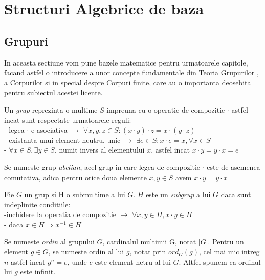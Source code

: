 %
%
\let\textcircled=\pgftextcircled

\chapter{Structuri Algebrice de baza} 
\section{Grupuri}
\label{sec:sec01}
In aceasta sectiune vom pune bazele matematice pentru urmatoarele capitole, facand astfel o introducere a unor concepte fundamentale din Teoria Grupurilor , a Corpurilor si in special despre Corpuri finite, care au o importanta deosebita pentru subiectul acestei licente.
\begin{dfn}
Un \textit{grup} reprezinta o multime $S$ impreuna cu o operatie de compozitie $\cdot$ astfel incat sunt respectate urmatoarele reguli:
\\ - legea $\cdot$ e asociativa $\rightarrow$ $\forall x, y, z\in S: (x\cdot y)\cdot z = x\cdot (y \cdot z)$
\\ - existanta unui element neutru, unic $\rightarrow$ $\exists e\in S: x \cdot e = x, \forall x\in S$
\\ - $\forall x\in S, \exists y\in S$, numit invers al elementului $x$, astfel incat $x\cdot y = y\cdot x = e$
\end{dfn}

\begin{dfn}
Se numeste grup \textit{abelian}, acel grup in care legea de compozitie $\cdot$ este de asemenea comutativa, adica pentru orice doua elemente
$x, y \in S$ avem $x \cdot y = y \cdot x$
\end{dfn}

\begin{dfn}
Fie $G$ un grup si H o submultime a lui $G$. $H$ este un \textit{subgrup} a lui $G$ daca sunt indeplinite conditiile:
\\ -inchidere la operatia de compozitie $\rightarrow$ $\forall x, y \in H, x \cdot y \in H$
\\ - daca $x \in H \Rightarrow x^{-1} \in H$
\end{dfn}

\begin{dfn}
Se numeste \textit{ordin} al grupului $G$, cardinalul multimii G, notat $|G|$. Pentru un element $g \in G$, se numeste ordin al lui $g$, notat prin $ord_G(g)$, cel mai
mic intreg $n$ astfel incat $g^n = e$, unde $e$ este element netru al lui $G$. Altfel spunem ca ordinul lui $g$ este infinit.
\end{dfn}

